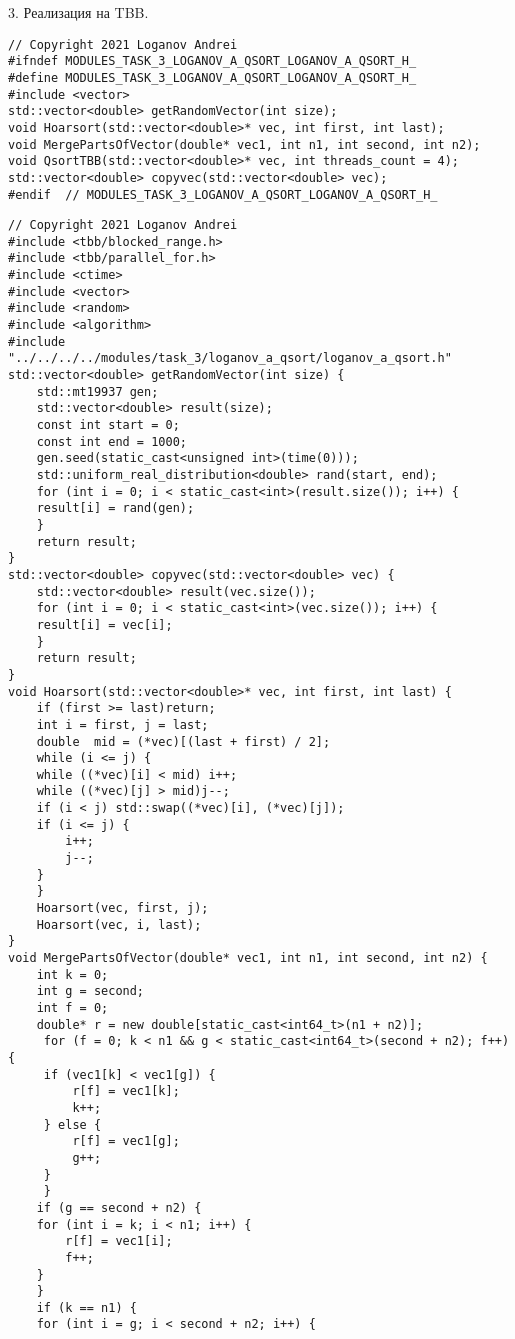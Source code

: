 \documentclass{report}
\begin{document}
\par 3. Реализация на TBB.
\begin{lstlisting}
// Copyright 2021 Loganov Andrei
#ifndef MODULES_TASK_3_LOGANOV_A_QSORT_LOGANOV_A_QSORT_H_
#define MODULES_TASK_3_LOGANOV_A_QSORT_LOGANOV_A_QSORT_H_
#include <vector>
std::vector<double> getRandomVector(int size);
void Hoarsort(std::vector<double>* vec, int first, int last);
void MergePartsOfVector(double* vec1, int n1, int second, int n2);
void QsortTBB(std::vector<double>* vec, int threads_count = 4);
std::vector<double> copyvec(std::vector<double> vec);
#endif  // MODULES_TASK_3_LOGANOV_A_QSORT_LOGANOV_A_QSORT_H_

\end{lstlisting}
\begin{lstlisting}
// Copyright 2021 Loganov Andrei
#include <tbb/blocked_range.h>
#include <tbb/parallel_for.h>
#include <ctime>
#include <vector>
#include <random>
#include <algorithm>
#include "../../../../modules/task_3/loganov_a_qsort/loganov_a_qsort.h"
std::vector<double> getRandomVector(int size) {
    std::mt19937 gen;
    std::vector<double> result(size);
    const int start = 0;
    const int end = 1000;
    gen.seed(static_cast<unsigned int>(time(0)));
    std::uniform_real_distribution<double> rand(start, end);
    for (int i = 0; i < static_cast<int>(result.size()); i++) {
    result[i] = rand(gen);
    }
    return result;
}
std::vector<double> copyvec(std::vector<double> vec) {
    std::vector<double> result(vec.size());
    for (int i = 0; i < static_cast<int>(vec.size()); i++) {
    result[i] = vec[i];
    }
    return result;
}
void Hoarsort(std::vector<double>* vec, int first, int last) {
    if (first >= last)return;
    int i = first, j = last;
    double  mid = (*vec)[(last + first) / 2];
    while (i <= j) {
    while ((*vec)[i] < mid) i++;
    while ((*vec)[j] > mid)j--;
    if (i < j) std::swap((*vec)[i], (*vec)[j]);
    if (i <= j) {
        i++;
        j--;
    }
    }
    Hoarsort(vec, first, j);
    Hoarsort(vec, i, last);
}
void MergePartsOfVector(double* vec1, int n1, int second, int n2) {
    int k = 0;
    int g = second;
    int f = 0;
    double* r = new double[static_cast<int64_t>(n1 + n2)];
     for (f = 0; k < n1 && g < static_cast<int64_t>(second + n2); f++) {
     if (vec1[k] < vec1[g]) {
         r[f] = vec1[k];
         k++;
     } else {
         r[f] = vec1[g];
         g++;
     }
     }
    if (g == second + n2) {
    for (int i = k; i < n1; i++) {
        r[f] = vec1[i];
        f++;
    }
    }
    if (k == n1) {
    for (int i = g; i < second + n2; i++) {

\end{lstlisting}
\end{document}
